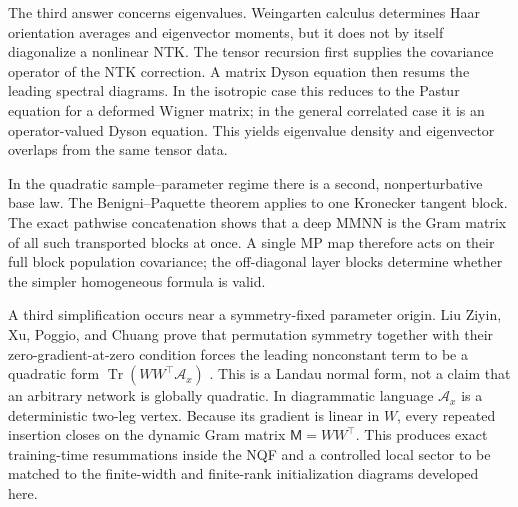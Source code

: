\documentclass{article}
\newcommand{\Tr}{\operatorname{Tr}}
\begin{document}
The third answer concerns eigenvalues.  Weingarten calculus determines Haar
orientation averages and eigenvector moments, but it does not by itself
diagonalize a nonlinear NTK.  The tensor recursion first supplies the
covariance operator of the NTK correction.  A matrix Dyson equation then
resums the leading spectral diagrams.  In the isotropic case this reduces to
the Pastur equation for a deformed Wigner matrix; in the general correlated
case it is an operator-valued Dyson equation.  This yields eigenvalue density
and eigenvector overlaps from the same tensor data.

In the quadratic sample--parameter regime there is a second, nonperturbative
base law.  The Benigni--Paquette theorem applies to one Kronecker tangent
block.  The exact pathwise concatenation shows that a deep MMNN is the Gram
matrix of all such transported blocks at once.  A single MP map therefore
acts on their full block population covariance; the off-diagonal layer
blocks determine whether the simpler homogeneous formula is valid.

A third simplification occurs near a symmetry-fixed parameter origin.
Liu Ziyin, Xu, Poggio, and Chuang prove that permutation symmetry together
with their zero-gradient-at-zero condition forces the leading nonconstant
term to be a quadratic form \(\Tr(WW^\top\mathscr A_x)\)
\citep{NQF2026}.  This is a Landau normal form, not a claim that an arbitrary
network is globally quadratic.  In diagrammatic language \(\mathscr A_x\)
is a deterministic two-leg vertex.  Because its gradient is linear in
\(W\), every repeated insertion closes on the dynamic Gram matrix
\(\mathsf M=WW^\top\).  This produces exact training-time resummations inside
the NQF and a controlled local sector to be matched to the finite-width and
finite-rank initialization diagrams developed here.
\end{document}
